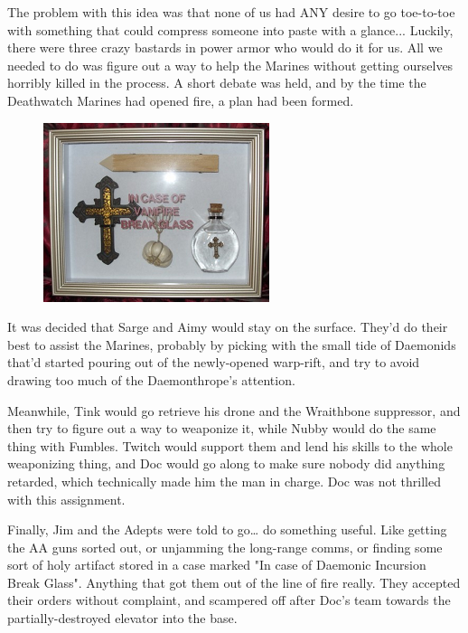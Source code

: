 The problem with this idea was that none of us had ANY desire to go toe-to-toe with something that could compress someone into paste with a glance... 
Luckily, there were three crazy bastards in power armor who would do it for us. 
All we needed to do was figure out a way to help the Marines without getting ourselves horribly killed in the process. 
A short debate was held, and by the time the Deathwatch Marines had opened fire, a plan had been formed.

\begin{figure}
	\begin{center}
		\includegraphics[width=\figwidth]{pics/16/19.png}
	\end{center}
\end{figure}
It was decided that Sarge and Aimy would stay on the surface. 
They'd do their best to assist the Marines, probably by picking with the small tide of Daemonids that'd started pouring out of the newly-opened warp-rift, and try to avoid drawing too much of the Daemonthrope's attention. 


Meanwhile, Tink would go retrieve his drone and the Wraithbone suppressor, and then try to figure out a way to weaponize it, while Nubby would do the same thing with Fumbles. 
Twitch would support them and lend his skills to the whole weaponizing thing, and Doc would go along to make sure nobody did anything retarded, which technically made him the man in charge. 
Doc was not thrilled with this assignment.

Finally, Jim and the Adepts were told to go… do something useful. 
Like getting the AA guns sorted out, or unjamming the long-range comms, or finding some sort of holy artifact stored in a case marked "In case of Daemonic Incursion Break Glass". 
Anything that got them out of the line of fire really. 
They accepted their orders without complaint, and scampered off after Doc's team towards the partially-destroyed elevator into the base.

